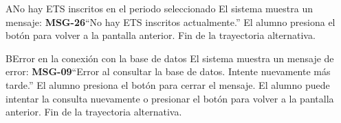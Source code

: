 \begin{UCtrayectoriaA}{A}{No hay ETS inscritos en el periodo seleccionado}
	\UCpaso El sistema muestra un mensaje: {\bf MSG-26}{``No hay ETS inscritos actualmente.''}
	\UCpaso[\UCactor] El alumno presiona el botón  para volver a la pantalla anterior.
	\UCpaso Fin de la trayectoria alternativa.
\end{UCtrayectoriaA}
\begin{UCtrayectoriaA}{B}{Error en la conexión con la base de datos}
	\UCpaso El sistema muestra un mensaje de error: {\bf MSG-09}{``Error al consultar la base de datos. Intente nuevamente más tarde.''}
	\UCpaso[\UCactor] El alumno presiona el botón  para cerrar el mensaje.
	\UCpaso[\UCactor] El alumno puede intentar la consulta nuevamente o presionar el botón  para volver a la pantalla anterior.
	\UCpaso Fin de la trayectoria alternativa.
\end{UCtrayectoriaA}

